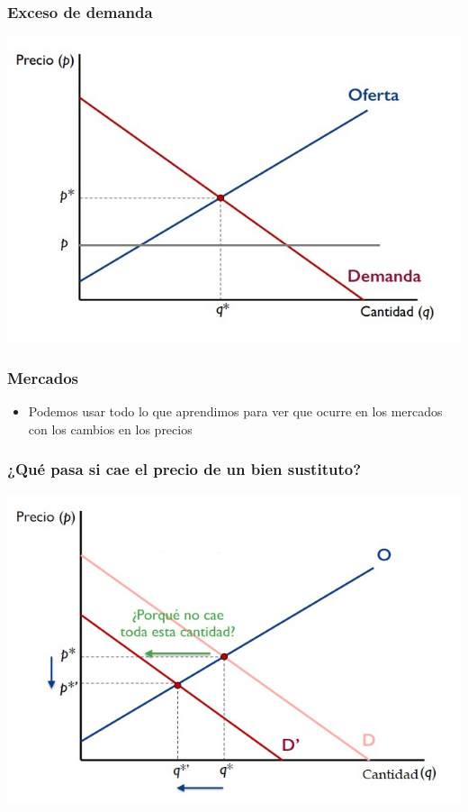 \documentclass{beamer}
\begin{document}
\begin{frame}
\frametitle{ Exceso de demanda}
\includegraphics[scale=0.6]{Figures/Tema_07.3_equilibrioofertademanda_0excesodedemanda.jpg}
\end{frame}

\begin{frame}
\frametitle{ Mercados}
\begin{itemize}
    \item Podemos usar todo lo que aprendimos para ver que ocurre en los mercados con los cambios en los precios
\end{itemize}
\end{frame}

\begin{frame}
\frametitle{ ¿Qué pasa si cae el precio de un bien sustituto?}
\centering
\includegraphics[scale=0.6]{Figures/Tema_07.4_equilibrioofertademanda.jpg}
\end{frame}
\end{document}
